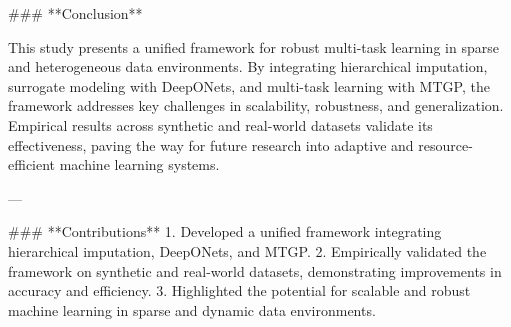 ### **Conclusion**  

This study presents a unified framework for robust multi-task learning in sparse and heterogeneous data environments. By integrating hierarchical imputation, surrogate modeling with DeepONets, and multi-task learning with MTGP, the framework addresses key challenges in scalability, robustness, and generalization. Empirical results across synthetic and real-world datasets validate its effectiveness, paving the way for future research into adaptive and resource-efficient machine learning systems.

---

### **Contributions**  
1. Developed a unified framework integrating hierarchical imputation, DeepONets, and MTGP.  
2. Empirically validated the framework on synthetic and real-world datasets, demonstrating improvements in accuracy and efficiency.  
3. Highlighted the potential for scalable and robust machine learning in sparse and dynamic data environments.  

